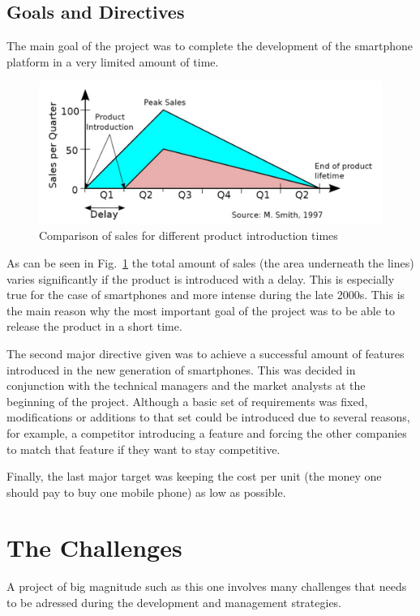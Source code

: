 \documentclass[journal]{IEEEtran}
\begin{document}
\subsection{Goals and Directives}
The main goal of the project was to complete the development of the smartphone platform in a very limited amount of time. 

\begin{figure}[h]
    \centering
    \includegraphics[width=\linewidth]{sales.jpg}
    \caption{Comparison of sales for different product introduction times}
    \label{fig:sales}
\end{figure}

As can be seen in Fig.~\ref{fig:sales} the total amount of sales (the area underneath the lines) varies significantly if the product is introduced with a delay. This is especially true for the case of smartphones and more intense during the late 2000s. This is the main reason why the most important goal of the project was to be able to release the product in a short time.

The second major directive given was to achieve a successful amount of features introduced in the new generation of smartphones. This was decided in conjunction with the technical managers and the market analysts at the beginning of the project. Although a basic set of requirements was fixed, modifications or additions to that set could be introduced due to several reasons, for example, a competitor introducing a feature and forcing the other companies to match that feature if they want to stay competitive.

Finally, the last major target was keeping the cost per unit (the money one should pay to buy one mobile phone) as low as possible. 

\section{The Challenges}
A project of big magnitude such as this one involves many challenges that needs to be adressed during the development and management strategies.
\end{document}

